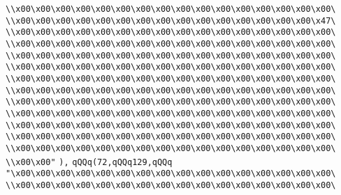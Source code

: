 \verb|\\x00\x00\x00\x00\x00\x00\x00\x00\x00\x00\x00\x00\x00\x00\x00\x00\|\newline
\verb|\\x00\x00\x00\x00\x00\x00\x00\x00\x00\x00\x00\x00\x00\x00\x00\x47\|\newline
\verb|\\x00\x00\x00\x00\x00\x00\x00\x00\x00\x00\x00\x00\x00\x00\x00\x00\|\newline
\verb|\\x00\x00\x00\x00\x00\x00\x00\x00\x00\x00\x00\x00\x00\x00\x00\x00\|\newline
\verb|\\x00\x00\x00\x00\x00\x00\x00\x00\x00\x00\x00\x00\x00\x00\x00\x00\|\newline
\verb|\\x00\x00\x00\x00\x00\x00\x00\x00\x00\x00\x00\x00\x00\x00\x00\x00\|\newline
\verb|\\x00\x00\x00\x00\x00\x00\x00\x00\x00\x00\x00\x00\x00\x00\x00\x00\|\newline
\verb|\\x00\x00\x00\x00\x00\x00\x00\x00\x00\x00\x00\x00\x00\x00\x00\x00\|\newline
\verb|\\x00\x00\x00\x00\x00\x00\x00\x00\x00\x00\x00\x00\x00\x00\x00\x00\|\newline
\verb|\\x00\x00\x00\x00\x00\x00\x00\x00\x00\x00\x00\x00\x00\x00\x00\x00\|\newline
\verb|\\x00\x00\x00\x00\x00\x00\x00\x00\x00\x00\x00\x00\x00\x00\x00\x00\|\newline
\verb|\\x00\x00\x00\x00\x00\x00\x00\x00\x00\x00\x00\x00\x00\x00\x00\x00\|\newline
\verb|\\x00\x00\x00\x00\x00\x00\x00\x00\x00\x00\x00\x00\x00\x00\x00\x00\|\newline
\verb|\\x00\x00"|\newline
\verb|),|\newline
\verb|qQQq(72,qQQq129,qQQq|\newline
\verb|"\x00\x00\x00\x00\x00\x00\x00\x00\x00\x00\x00\x00\x00\x00\x00\x00\|\newline
\verb|\\x00\x00\x00\x00\x00\x00\x00\x00\x00\x00\x00\x00\x00\x00\x00\x00\|\newline
